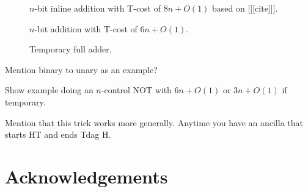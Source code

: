\documentclass[twocolumn,longbibliography]{quantumarticle-customized}
\begin{document}
\begin{figure}
  \centering
  \makebox[\linewidth]{
  }
  \caption{
	$n$-bit inline addition with T-cost of $8n + O(1)$ based on [[[cite]]].
  }
  \label{fig:inline-addition}
\end{figure}

\begin{figure}
  \centering
  \makebox[\linewidth]{
  }
  \caption{
	$n$-bit addition with T-cost of $6n + O(1)$.
  }
  \label{fig:ancilla-addition}
\end{figure}

\begin{figure}
  \caption{
	Temporary full adder.
  }
  \label{fig:temporary-ancilla-addition}
\end{figure}

Mention binary to unary as an example?


Show example doing an $n$-control NOT with $6n + O(1)$ or $3n + O(1)$ if temporary.

Mention that this trick works more generally. Anytime you have an ancilla that starts HT and ends Tdag H.


\section{Acknowledgements}
\end{document}
